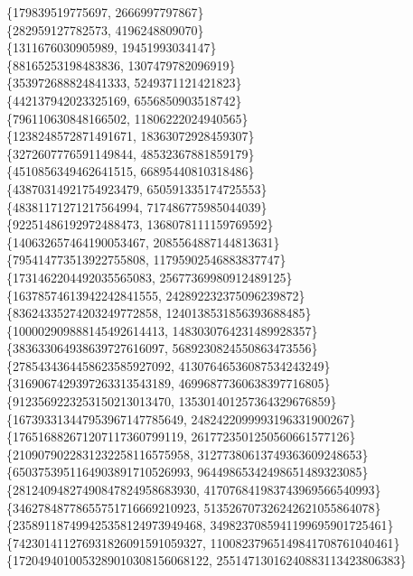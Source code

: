 \documentclass[fleqn]{article}
\begin{document}
    \{179839519775697, 2666997797867\} \\
    \{282959127782573, 4196248809070\} \\
    \{1311676030905989, 19451993034147\} \\
    \{88165253198483836, 1307479782096919\} \\
    \{353972688824841333, 5249371121421823\} \\
    \{442137942023325169, 6556850903518742\} \\
    \{796110630848166502, 11806222024940565\} \\
    \{1238248572871491671, 18363072928459307\} \\
    \{3272607776591149844, 48532367881859179\} \\
    \{4510856349462641515, 66895440810318486\} \\
    \{43870314921754923479, 650591335174725553\} \\
    \{48381171271217564994, 717486775985044039\} \\
    \{92251486192972488473, 1368078111159769592\} \\
    \{140632657464190053467, 2085564887144813631\} \\
    \{795414773513922755808, 11795902546883837747\} \\
    \{1731462204492035565083, 25677369980912489125\} \\
    \{16378574613942242841555, 242892232375096239872\} \\
    \{83624335274203249772858, 1240138531856393688485\} \\
    \{100002909888145492614413, 1483030764231489928357\} \\
    \{383633064938639727616097, 5689230824550863473556\} \\
    \{2785434364458623585927092, 41307646536087534243249\} \\
    \{3169067429397263313543189, 46996877360638397716805\} \\
    \{9123569223253150213013470, 135301401257364329676859\} \\
    \{167393313447953967147785649, 2482422099993196331900267\} \\
    \{176516882671207117360799119, 2617723501250560661577126\} \\
    \{2109079022831232258116575958, 31277380613749363609248653\} \\
    \{6503753951164903891710526993, 96449865342498651489323085\} \\
    \{28124094827490847824958683930, 417076841983743969566540993\} \\
    \{34627848778655751716669210923, 513526707326242621055864078\} \\
    \{235891187499425358124973949468, 3498237085941199695901725461\} \\
    \{742301411276931826091591059327, 11008237965149841708761040461\} \\
    \{1720494010053289010308156068122, 25514713016240883113423806383\} \\
\end{document}

